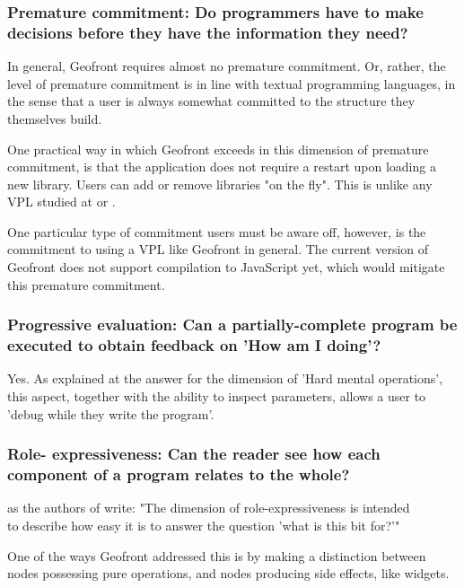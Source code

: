 \subsubsection*{Premature commitment: Do programmers have to make decisions before they have the information they need?}

In general, Geofront requires almost no premature commitment. 
Or, rather, the level of premature commitment is in line with textual programming languages, in the sense that a user is always somewhat committed to the structure they themselves build. 

One practical way in which Geofront exceeds in this dimension of premature commitment, is that the application does not require a restart upon loading a new library. 
Users can add or remove libraries "on the fly". 
This is unlike any VPL studied at  or .

One particular type of commitment users must be aware off, however, is the commitment to using a \ac{VPL} like Geofront in general.
The current version of Geofront does not support compilation to JavaScript yet, which would mitigate this premature commitment. 


\subsubsection*{Progressive evaluation: Can a partially-complete program be executed to obtain feedback on 'How am I doing'?}

Yes. 
As explained at the answer for the dimension of 'Hard mental operations', this aspect, together with the ability to inspect parameters, allows a user to 'debug while they write the program'.

\subsubsection*{Role- expressiveness: Can the reader see how each component of a program relates to the whole?}

as the authors of \citet{green_usability_1996} write: "The dimension of role-expressiveness is intended  \\ to describe how easy it is to answer the question 'what is this bit for?'"

One of the ways Geofront addressed this is by making a distinction between nodes possessing pure operations, and nodes producing side effects, like widgets. 

